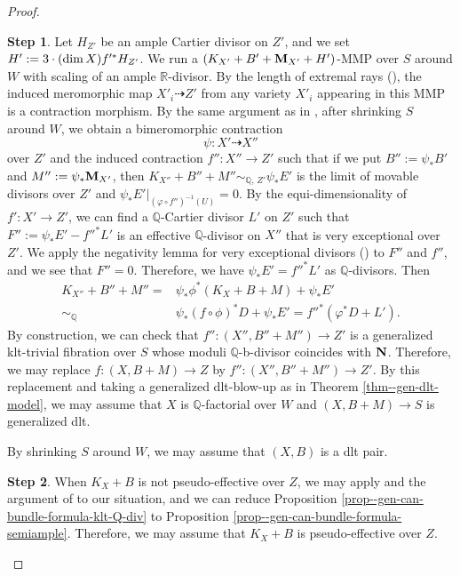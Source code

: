 \documentclass[12pt]{amsart}
\theoremstyle{definition}
\newtheorem{step3}{Step}
\begin{document}
\begin{proof}
\begin{step3}
Let $H_{Z'}$ be an ample Cartier divisor on $Z'$, and we set $H':=3 \cdot ({\rm dim}\,X) f'^{*}H_{Z'}$. 
We run a $(K_{X'}+B'+\boldsymbol{\rm M}_{X'}+H')$-MMP over $S$ around $W$ with scaling of an ample $\mathbb{R}$-divisor. 
By the length of extremal rays (\cite[Theorem 1.1.6 (5)]{fujino-analytic-conethm}), the induced meromorphic map $X'_{i} \dashrightarrow Z'$ from any variety $X'_{i}$ appearing in this MMP is a contraction morphism. 
By the same argument as in \cite[Proof of Lemma 5.4]{eh-analytic-mmp}, after shrinking $S$ around $W$, we obtain a bimeromorphic contraction 
$$\psi \colon X' \dashrightarrow X''$$
over $Z'$ and the induced contraction $f'' \colon X'' \to Z'$ such that if we put $B'':=\psi_{*}B'$ and $M'':=\psi_{*}\boldsymbol{\rm M}_{X'}$, then $K_{X''}+B''+M''\sim_{\mathbb{Q},\,Z'}\psi_{*}E'$ is the limit of movable divisors over $Z'$ and $\psi_{*}E'|_{(\varphi \circ f'')^{-1}(U)}=0$. 
By the equi-dimensionality of $f'\colon X' \to Z'$, we can find a $\mathbb{Q}$-Cartier divisor $L'$ on $Z'$ such that $F'':=\psi_{*}E'-f''^{*}L'$ is an effective $\mathbb{Q}$-divisor on $X''$ that is very exceptional over $Z'$.  
We apply the negativity lemma for very exceptional divisors (\cite[Corollary 2.15]{eh-analytic-mmp}) to $F''$ and $f''$, and we see that $F'' =0$. 
Therefore, we have $\psi_{*}E'=f''^{*}L'$ as $\mathbb{Q}$-divisors. 
Then
\begin{equation*}
\begin{split}
K_{X''}+B''+M''=&\psi_{*}\phi^{*}(K_{X}+B+M)+\psi_{*}E'\\
\sim_{\mathbb{Q}}& \psi_{*}(f \circ \phi)^{*}D+\psi_{*}E'
=f''^{*}(\varphi^{*}D+L').
\end{split}
\end{equation*}
By construction, we can check that $f'' \colon (X'',B''+M'') \to Z'$ is a generalized klt-trivial fibration over $S$ whose moduli $\mathbb{Q}$-b-divisor coincides with $\boldsymbol{\rm N}$. 
Therefore, we may replace $f \colon (X,B+M) \to Z$ by $f'' \colon (X'',B''+M'') \to Z'$. 
By this replacement and taking a generalized dlt-blow-up as in Theorem \ref{thm--gen-dlt-model}, we may assume that $X$ is $\mathbb{Q}$-factorial over $W$ and $(X,B+M) \to S$ is generalized dlt. 
\end{step3}

By shrinking $S$ around $W$, we may assume that $(X,B)$ is a dlt pair. 

\begin{step3}\label{step2--prop--gen-can-bundle-formula-klt-Q-div}
When $K_{X}+B$ is not pseudo-effective over $Z$, we may apply \cite{fujino-analytic-bchm} and the argument of \cite[Proof of Lemma 5.2 and Theorem 1.4]{filipazzi-gen-can-bundle-formula} to our situation, and we can reduce Proposition \ref{prop--gen-can-bundle-formula-klt-Q-div} to Proposition \ref{prop--gen-can-bundle-formula-semiample}. 
Therefore, we may assume that $K_{X}+B$ is pseudo-effective over $Z$. 
\end{step3}



\end{proof}
\end{document}
